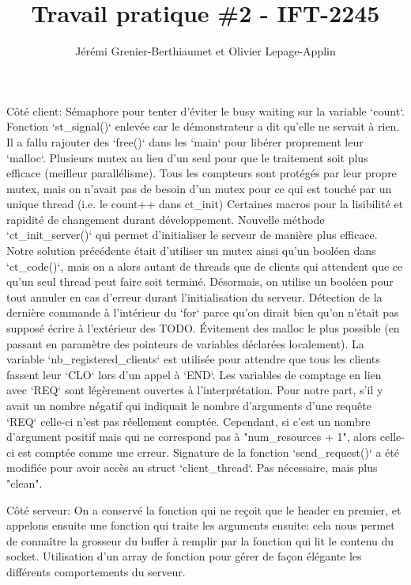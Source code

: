 \documentclass[11pt]{article}
\title{Travail pratique \#2 - IFT-2245}
\author{Jérémi Grenier-Berthiaumet et Olivier Lepage-Applin}
\begin{document}
\maketitle


Côté client:
Sémaphore pour tenter d'éviter le busy waiting sur la variable `count`.
Fonction `st\_signal()` enlevée car le démonstrateur a dit qu'elle ne servait à rien.
Il a fallu rajouter des `free()` dans les `main` pour libérer proprement leur `malloc`.
Plusieurs mutex au lieu d'un seul pour que le traitement soit plus efficace (meilleur parallélisme). Tous les compteurs sont protégés par leur propre mutex, mais on n'avait pas de besoin d'un mutex pour ce qui est touché par un unique thread (i.e. le count++ dans ct\_init)
Certaines macros pour la lisibilité et rapidité de changement durant développement.
Nouvelle méthode `ct\_init\_server()` qui permet d'initialiser le serveur de manière plus efficace. Notre solution précédente était d'utiliser un mutex ainsi qu'un booléen dans `ct\_code()`, mais on a alors autant de threads que de clients qui attendent que ce qu'un seul thread peut faire soit terminé. Désormais, on utilise un booléen pour tout annuler en cas d'erreur durant l'initialisation du serveur.
Détection de la dernière commande à l'intérieur du `for` parce qu'on dirait bien qu'on n'était pas supposé écrire à l'extérieur des TODO.
Évitement des malloc le plus possible (en passant en paramètre des pointeurs de variables déclarées localement).
La variable `nb\_registered\_clients` est utilisée pour attendre que tous les clients fassent leur `CLO` lors d'un appel à `END`.
Les variables de comptage en lien avec `REQ` sont légèrement ouvertes à l'interprétation. Pour notre part, s'il y avait un nombre négatif qui indiquait le nombre d'arguments d'une requête `REQ` celle-ci n'est pas réellement comptée. Cependant, si c'est un nombre d'argument positif mais qui ne correspond pas à "num\_resources + 1", alors celle-ci est comptée comme une erreur.
Signature de la fonction `send\_request()` a été modifiée pour avoir accès au struct `client\_thread`. Pas nécessaire, mais plus "clean".


Côté serveur:
On a conservé la fonction qui ne reçoit que le header en premier, et appelons ensuite une fonction qui traite les arguments ensuite: cela nous permet de connaître la grosseur du buffer à remplir par la fonction qui lit le contenu du socket.
Utilisation d'un array de fonction pour gérer de façon élégante les différents comportements du serveur.
\end{document}
